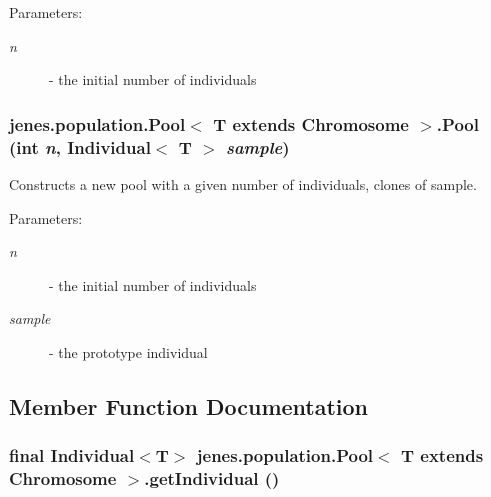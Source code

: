 \begin{Desc}
\item[Parameters:]
\begin{description}
\item[{\em n}]- the initial number of individuals \end{description}
\end{Desc}
\hypertarget{classjenes_1_1population_1_1_pool_3_01_t_01extends_01_chromosome_01_4_4326e7c61485eebd85e0ee33ade6ae4a}{
\subsubsection[Pool]{\setlength{\rightskip}{0pt plus 5cm}jenes.population.Pool$<$ T extends Chromosome $>$.Pool (int {\em n}, \/  Individual$<$ T $>$ {\em sample})}}
\label{classjenes_1_1population_1_1_pool_3_01_t_01extends_01_chromosome_01_4_4326e7c61485eebd85e0ee33ade6ae4a}


Constructs a new pool with a given number of individuals, clones of sample. 

\begin{Desc}
\item[Parameters:]
\begin{description}
\item[{\em n}]- the initial number of individuals \item[{\em sample}]- the prototype individual \end{description}
\end{Desc}


\subsection{Member Function Documentation}
\hypertarget{classjenes_1_1population_1_1_pool_3_01_t_01extends_01_chromosome_01_4_56aa9e4c1a8fb6c95c88cbc09f677400}{
\subsubsection[getIndividual]{\setlength{\rightskip}{0pt plus 5cm}final Individual$<$T$>$ jenes.population.Pool$<$ T extends Chromosome $>$.getIndividual ()}}
\label{classjenes_1_1population_1_1_pool_3_01_t_01extends_01_chromosome_01_4_56aa9e4c1a8fb6c95c88cbc09f677400}


